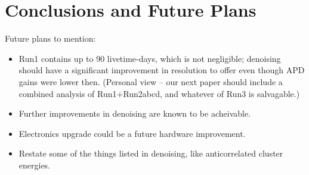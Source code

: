 \renewcommand{\thechapter}{7}
\chapter{Conclusions and Future Plans}

Future plans to mention:
\begin{itemize}
\item Run1 contains up to 90 livetime-days, which is not negligible; denoising should have a significant improvement in resolution to offer even though APD gains were lower then.  (Personal view -- our next paper should include a combined analysis of Run1+Run2abcd, and whatever of Run3 is salvagable.)
\item Further improvements in denoising are known to be acheivable.
\item Electronics upgrade could be a future hardware improvement.
\item Restate some of the things listed in denoising, like anticorrelated cluster energies.
\end{itemize}
